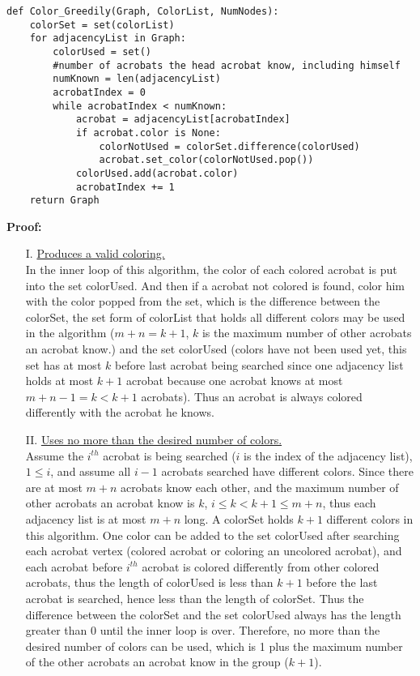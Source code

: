 \documentclass[10pt]{article}
\begin{document}
\begin{enumerate}[label=(\alph*)]
\begin{mdframed}
\begin{lstlisting}
def Color_Greedily(Graph, ColorList, NumNodes):
    colorSet = set(colorList)
    for adjacencyList in Graph:
        colorUsed = set()
        #number of acrobats the head acrobat know, including himself
        numKnown = len(adjacencyList)
        acrobatIndex = 0
        while acrobatIndex < numKnown:
            acrobat = adjacencyList[acrobatIndex]
            if acrobat.color is None:
                colorNotUsed = colorSet.difference(colorUsed)
                acrobat.set_color(colorNotUsed.pop())
            colorUsed.add(acrobat.color)
            acrobatIndex += 1
    return Graph
        \end{lstlisting}
    \textbf{Proof:}
    \begin{enumerate}[leftmargin=10mm]
        \item[I.] \underline{Produces a valid coloring.}\\
        In the inner loop of this algorithm, the color of each colored acrobat is put into the set colorUsed. And then if a acrobat not colored is found, color him with the color popped from the set, which is the difference between the colorSet, the set form of colorList that holds all different colors may be used in the algorithm ($m + n = k + 1$, $k$ is the maximum number of other acrobats an acrobat know.) and the set colorUsed (colors have not been used yet, this set has at most $k$ before last acrobat being searched since one adjacency list holds at most $k + 1$ acrobat because one acrobat knows at most $m + n - 1 = k < k + 1$ acrobats). Thus an acrobat is always colored differently with the acrobat he knows.
        \item[II.] \underline{Uses no more than the desired number of colors.}\\
        Assume the $i^{th}$ acrobat is being searched ($i$ is the index of the adjacency list), $1 \leq i$, and assume all $i - 1$ acrobats searched have different colors. Since there are at most $m + n$ acrobats know each other, and the maximum number of other acrobats an acrobat know is $k$, $i \leq k < k + 1 \leq m + n$, thus each adjacency list is at most $m + n$ long. A colorSet holds $k + 1$ different colors in this algorithm. One color can be added to the set colorUsed after searching each acrobat vertex (colored acrobat or coloring an uncolored acrobat), and each acrobat before $i^{th}$ acrobat is colored differently from other colored acrobats, thus the length of colorUsed is less than $k + 1$ before the last acrobat is searched, hence less than the length of colorSet. Thus the difference between the colorSet and the set colorUsed always has the length greater than 0 until the inner loop is over. Therefore, no more than the desired number of colors can be used, which is 1 plus the maximum number of the other acrobats an acrobat know in the group ($k + 1$).

\end{enumerate}
\end{mdframed}
\end{enumerate}
\end{document}

